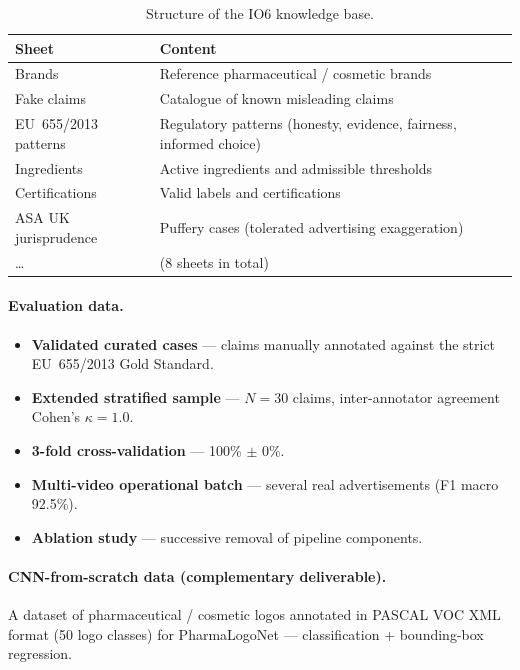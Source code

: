 \documentclass[11pt,a4paper]{article}
\begin{document}
\begin{table}[h]
\centering
\small
\begin{tabular}{>{\raggedright\arraybackslash}p{4.5cm} >{\raggedright\arraybackslash}p{9.5cm}}
\toprule
\textbf{Sheet} & \textbf{Content} \\
\midrule
Brands              & Reference pharmaceutical / cosmetic brands \\
Fake claims         & Catalogue of known misleading claims \\
EU~655/2013 patterns & Regulatory patterns (honesty, evidence, fairness, informed choice) \\
Ingredients         & Active ingredients and admissible thresholds \\
Certifications      & Valid labels and certifications \\
ASA UK jurisprudence & Puffery cases (tolerated advertising exaggeration) \\
\dots               & (8 sheets in total) \\
\bottomrule
\end{tabular}
\caption{Structure of the IO6 knowledge base.}
\end{table}

\paragraph{Evaluation data.}
\begin{itemize}[noitemsep]
  \item \textbf{Validated curated cases} --- claims manually annotated against the
  strict EU~655/2013 Gold Standard.
  \item \textbf{Extended stratified sample} --- $N=30$ claims, inter-annotator
  agreement Cohen's $\kappa = 1.0$.
  \item \textbf{3-fold cross-validation} --- 100\% $\pm$ 0\%.
  \item \textbf{Multi-video operational batch} --- several real advertisements
  (F1 macro 92.5\%).
  \item \textbf{Ablation study} --- successive removal of pipeline components.
\end{itemize}

\paragraph{CNN-from-scratch data (complementary deliverable).}
A dataset of pharmaceutical / cosmetic logos annotated in PASCAL VOC XML format
(50 logo classes) for PharmaLogoNet --- classification + bounding-box regression.
\end{document}
